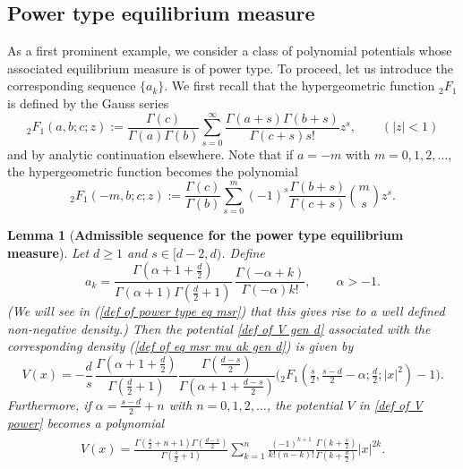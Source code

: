 \documentclass[10pt]{amsart}
\theoremstyle{plain}
\newtheorem{lem}[thm]{Lemma}
\theoremstyle{remark}
\numberwithin{equation}{section}
\begin{document}
\subsection{Power type equilibrium measure}\label{S1.2}

As a first prominent example, we consider a class of polynomial potentials whose associated equilibrium measure is of power type. To proceed, let us introduce the corresponding sequence $\{a_k\}$.
We first recall that the hypergeometric function ${}_2 F_1$ is defined by the Gauss series 
\begin{equation} \label{def of 2F1 Gauss series}
	{}_2 F_1(a,b;c;z):=\frac{\Gamma(c)}{\Gamma(a)\Gamma(b)} \sum_{s=0}^\infty  \frac{\Gamma(a+s) \Gamma(b+s) }{ \Gamma(c+s) s! } z^s, \qquad (|z|<1)
\end{equation}
and by analytic continuation elsewhere. Note that if $a=-m$ with $m=0,1,2,\dots$, the hypergeometric function becomes the polynomial 
\begin{equation} \label{def of 2F1 Gauss series poly case}
	{}_2 F_1(-m,b;c;z):=\frac{\Gamma(c)}{\Gamma(b)} \sum_{s=0}^m  (-1)^s\frac{ \Gamma(b+s) }{ \Gamma(c+s)  } \binom{m}{s}z^s. 
\end{equation}

\begin{lem}[\textbf{Admissible sequence for the power type equilibrium measure}] \label{Lem_ak for power type eq msr}
Let $d \ge 1$ and $s \in [d-2,d)$. Define  
\begin{equation} \label{def of ak for power type eq msr}
a_k =  \frac{ \Gamma(\alpha+1+\frac{d}{2}) }{ \Gamma(\alpha+1)\Gamma(\frac{d}{2}+1) } \,  \frac{ \Gamma(-\alpha+k) }{ \Gamma(-\alpha) k! } , \qquad \alpha>-1.
\end{equation} 
(We will see in (\ref{def of power type eq msr}) that this gives rise to a well defined non-negative density.)
Then the potential \eqref{def of V gen d} associated with the corresponding density (\ref{def of eq msr mu ak gen d}) is given by 
\begin{equation} \label{def of V power}
V(x) =-\frac{d}{s} \,  \frac{ \Gamma(\alpha+1+\frac{d}{2}) }{  \Gamma(\frac{d}{2}+1) }   \frac{ \Gamma(\frac{d-s}{2})  }{ \Gamma(\alpha+1+\frac{d-s}{2}) } 
  \Big (   {}_2F_1(\tfrac{s}{2},\tfrac{s-d}{2}-\alpha;\tfrac{d}{2};|x|^2) - 1    \Big )  . 
\end{equation} 
Furthermore, if $\alpha=\frac{s-d}{2} +n$ with $n=0,1,2,\dots$, the potential $V$ in \eqref{def of V power} becomes a polynomial
\begin{align}  \label{def of V power poly}
\begin{split} 
V(x) =   \frac{ \Gamma(\frac{s}{2} +n+1) \Gamma(\frac{d-s}{2})   }{ \Gamma(\frac{s}{2}+1) }   \sum_{k=1}^n   \frac{ (-1)^{k+1}  }{k!(n-k)!} \frac{ \Gamma(k+\frac{s}{2}) }{   \Gamma(k+\frac{d}{2}) } |x|^{2k} . 
\end{split}
\end{align}
\end{lem} 
\end{document}
